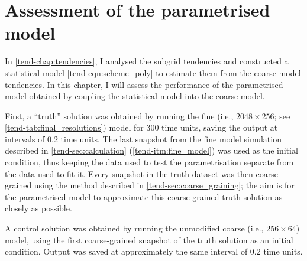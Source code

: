 \documentclass[../main.tex]{subfiles}
\begin{document}
\ifSubfilesClassLoaded{
    \frontmatter
    \tableofcontents
    \mainmatter
}{}

\chapter{Assessment of the parametrised model} \label{chap:evaluation}
\setlength{\epigraphwidth}{0.5\linewidth}

In \cref{tend-chap:tendencies}, I analysed the subgrid tendencies and
constructed a statistical model \cref{tend-eqn:scheme_poly} to estimate
them from the coarse model tendencies. In this chapter, I will assess
the performance of the parametrised model obtained by coupling the
statistical model into the coarse \rb{} model.

First, a ``truth'' solution was obtained by running the fine (i.e., $2048
\times 256$; see \cref{tend-tab:final_resolutions}) model for 300 time units,
saving the output at intervals of 0.2 time units. The last snapshot from the
fine model simulation described in \cref{tend-sec:calculation}
(\cref{tend-itm:fine_model}) was used as the initial condition, thus keeping
the data used to test the parametrisation separate from the data used to fit
it. Every snapshot in the truth dataset was then coarse-grained using the
method described in \cref{tend-sec:coarse_graining}; the aim is for the
parametrised model to approximate this coarse-grained truth solution as closely
as possible.

A control solution was obtained by running the unmodified coarse (i.e., $256
\times 64$) model, using the first coarse-grained snapshot of the truth
solution as an initial condition. Output was saved at approximately the
same interval of 0.2 time units.
\end{document}
